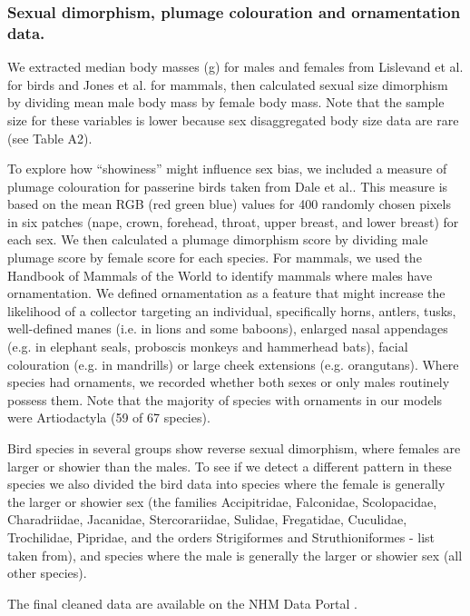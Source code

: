 \documentclass[a4paper, 12pt]{article}
\begin{document}
\subsubsection{Sexual dimorphism, plumage colouration and ornamentation data.}
We extracted median body masses (g) for males and females from Lislevand et al.\cite{lislevand2007avian} for birds and Jones et al.\cite{pantheria} for mammals, then calculated sexual size dimorphism by dividing mean male body mass by female body mass. 
Note that the sample size for these variables is lower because sex disaggregated body size data are rare (see Table A2).

To explore how ``showiness'' might influence sex bias, we included a measure of plumage colouration for passerine birds taken from Dale et al.\cite{dale2015data,dale2015effects}. 
This measure is based on the mean RGB (red green blue) values for 400 randomly chosen pixels in six patches (nape, crown, forehead, throat, upper breast, and lower breast) for each sex. 
We then calculated a plumage dimorphism score by dividing male plumage score by female score for each species. 
For mammals, we used the Handbook of Mammals of the World to identify mammals where males have ornamentation. 
We defined ornamentation as a feature that might increase the likelihood of a collector targeting an individual, specifically horns, antlers, tusks, well-defined manes (i.e. in lions and some baboons), enlarged nasal appendages (e.g. in elephant seals, proboscis monkeys and hammerhead bats), facial colouration (e.g. in mandrills) or large cheek extensions (e.g. orangutans). 
Where species had ornaments, we recorded whether both sexes or only males routinely possess them. 
Note that the majority of species with ornaments in our models were Artiodactyla (59 of 67 species). 

Bird species in several groups show reverse sexual dimorphism, where females are larger or showier than the males. 
To see if we detect a different pattern in these species we also divided the bird data into species where the female is generally the larger or showier sex (the families  Accipitridae, Falconidae, Scolopacidae, Charadriidae, Jacanidae, Stercorariidae, Sulidae, Fregatidae, Cuculidae, Trochilidae, Pipridae, and the orders Strigiformes and Struthioniformes - list taken from\cite{swaddle2000novel}), and species where the male is generally the larger or showier sex (all other species). 

The final cleaned data are available on the NHM Data Portal \cite{sex-bias-data}. 
\end{document}
